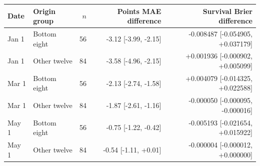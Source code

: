 \small
\begin{tabular}{llrrr}
\toprule
Date & Origin group & $n$ & Points MAE difference & Survival Brier difference \\
\midrule
Jan 1 & Bottom eight & 56 & -3.12 [-3.99, -2.15] & -0.008487 [-0.054905, +0.037179] \\
Jan 1 & Other twelve & 84 & -3.58 [-4.96, -2.15] & +0.001936 [-0.000902, +0.005099] \\
Mar 1 & Bottom eight & 56 & -2.13 [-2.74, -1.58] & +0.004079 [-0.014325, +0.022588] \\
Mar 1 & Other twelve & 84 & -1.87 [-2.61, -1.16] & -0.000050 [-0.000095, -0.000016] \\
May 1 & Bottom eight & 56 & -0.75 [-1.22, -0.42] & -0.005193 [-0.021654, +0.015922] \\
May 1 & Other twelve & 84 & -0.54 [-1.11, +0.01] & -0.000004 [-0.000012, +0.000000] \\
\bottomrule
\end{tabular}
